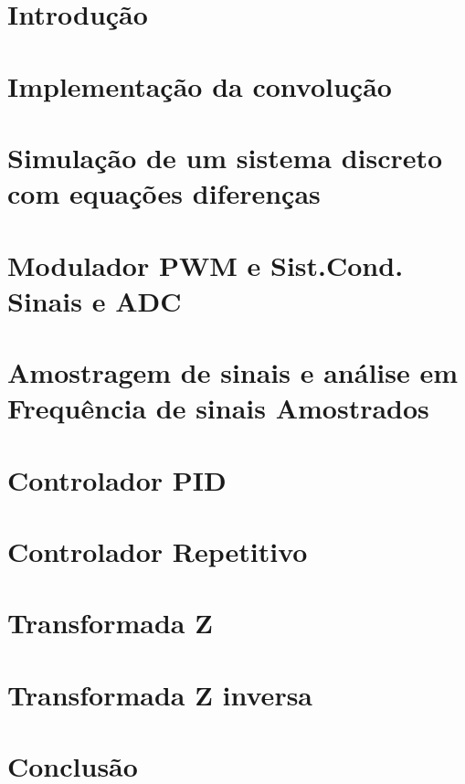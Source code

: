 \documentclass[capchap,sumarioincompleto,a4paper,12pt,ruledheader,normaltoc]{utfprtex}%
\begin{document}
\capa
\newpage
\sumario
\newpage
\newpage

\chapter{Introdução}

\chapter{Implementação da convolução}


\chapter{Simulação de um sistema discreto com equações diferenças}


\chapter{Modulador PWM e Sist.Cond. Sinais e ADC}


\chapter{Amostragem de sinais e análise em Frequência de sinais Amostrados}


\chapter{Controlador PID}


\chapter{Controlador Repetitivo}


\chapter{Transformada Z}


\chapter{Transformada Z inversa}


\chapter{Conclusão}



\end{document}
